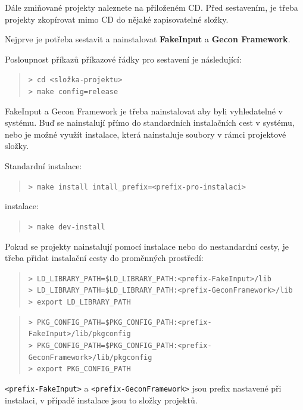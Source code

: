 \bigskip\noindent
Dále zmiňované projekty naleznete na přiloženém CD. Před sestavením, je třeba
projekty zkopírovat mimo CD do nějaké zapisovatelné složky.

\bigskip\noindent
Nejprve je potřeba sestavit a nainstalovat \textbf{FakeInput} a
\textbf{Gecon Framework}.

Posloupnost příkazů příkazové řádky pro sestavení je následující:

\begin{quote}
\texttt{> cd <složka-projektu>}\\
\texttt{> make config=release}
\end{quote}

FakeInput a Gecon Framework je třeba nainstalovat aby byli vyhledatelné v
systému. Buď se nainstalují přímo do standardních instalačních cest v systému,
nebo je možné využít  instalace, která nainstaluje soubory v
rámci projektové složky.

Standardní instalace:
\begin{quote}
\texttt{> make install intall\_prefix=<prefix-pro-instalaci>}
\end{quote}

 instalace:
\begin{quote}
\texttt{> make dev-install}
\end{quote}

Pokud se projekty nainstalují pomocí  instalace nebo do
nestandardní cesty, je třeba přidat instalační cesty do proměnných prostředí:

\begin{quote}
\small
\texttt{> LD\_LIBRARY\_PATH=\$LD\_LIBRARY\_PATH:<prefix-FakeInput>/lib}\\
\texttt{> LD\_LIBRARY\_PATH=\$LD\_LIBRARY\_PATH:<prefix-GeconFramework>/lib}\\
\texttt{> export LD\_LIBRARY\_PATH}
\end{quote}
\begin{quote}
\small
\texttt{>
    PKG\_CONFIG\_PATH=\$PKG\_CONFIG\_PATH:<prefix-FakeInput>/lib/pkgconfig}\\
\texttt{>
    PKG\_CONFIG\_PATH=\$PKG\_CONFIG\_PATH:<prefix-GeconFramework>/lib/pkgconfig}\\
\texttt{> export PKG\_CONFIG\_PATH}
\end{quote}

\texttt{<prefix-FakeInput>} a \texttt{<prefix-GeconFramework>} jsou prefix
nastavené při instalaci, v případě  instalace jsou to složky
projektů.

